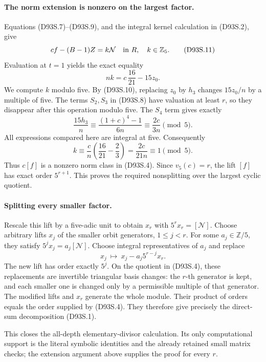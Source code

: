 \paragraph{The norm extension is nonzero on the largest factor.}
Equations (D93S.7)--(D93S.9), and the integral kernel
calculation in (D93S.2), give
\[
             c f-(B-1)Z=k\mathcal N
                   \quad\hbox{in }R,\quad k\in\mathbb Z_5.
                                                               \tag{D93S.11}
\]
Evaluation at \(t=1\) yields the exact equality
\[
                 nk=c\,\frac{16}{21}-15z_0.            \tag{D93S.12}
\]
We compute \(k\) modulo five. By (D93S.10), replacing
\(z_0\) by \(h_3\) changes \(15z_0/n\) by a multiple
of five. The terms \(S_2,S_3\) in (D93S.8) have
valuation at least \(r\), so they disappear after this
operation modulo five. The \(S_4\) term gives exactly
\[
 \frac{15h_3}{n}
   \equiv\frac{(1+c)^4-1}{6n}
   \equiv\frac{2c}{3n}\pmod5.
\]
All expressions compared here are integral at five.
Consequently
\[
       k\equiv\frac cn\left(\frac{16}{21}-\frac23\right)
        =\frac{2c}{21n}\equiv1\pmod5.                 \tag{D93S.13}
\]
Thus \(c[f]\) is a nonzero norm class in (D93S.4).
Since \(v_5(c)=r\), the lift \([f]\) has exact order
\(5^{r+1}\). This proves the required nonsplitting over
the largest cyclic quotient.

\paragraph{Splitting every smaller factor.}
Rescale this lift by a five-adic unit to obtain \(x_r\)
with \(5^r x_r=[\mathcal N]\). Choose arbitrary lifts
\(x_j\) of the smaller orbit generators, \(1\le j<r\).
For some \(a_j\in\mathbb Z/5\), they satisfy
\(5^jx_j=a_j[\mathcal N]\).
Choose integral representatives of \(a_j\) and replace
\[
                     x_j\ \longmapsto\
                     x_j-a_j5^{r-j}x_r .
 \]
The new lift has order exactly \(5^j\). On the quotient
in (D93S.4), these replacements are invertible triangular
basis changes: the \(r\)-th generator is kept, and each
smaller one is changed only by a permissible multiple of
that generator. The modified lifts and \(x_r\) generate
the whole module. Their product of orders equals the
order supplied by (D93S.4). They therefore give precisely
the direct-sum decomposition (D93S.1).

This closes the all-depth elementary-divisor calculation.
Its only computational support is the literal symbolic
identities and the already retained small matrix checks;
the extension argument above supplies the proof for
every \(r\).
